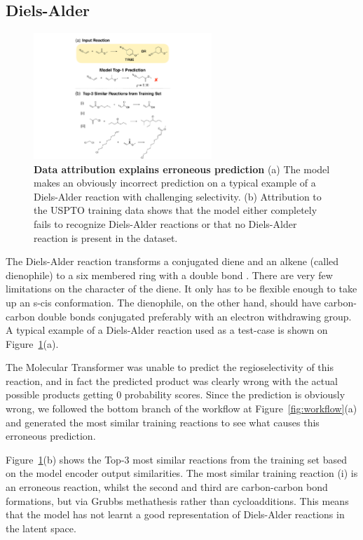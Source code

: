 \subsection{Diels-Alder}

\begin{figure}[ht!]
    \centering
    \includegraphics[width=0.6\textwidth]{Chapters/Transformer/Figs/diels_alder.pdf}
    \caption{\label{fig:diels_alder} \textbf{Data attribution explains erroneous prediction} (a) The model makes an obviously incorrect prediction on a typical example of a Diels-Alder reaction with challenging selectivity. (b) Attribution to the USPTO training data shows that the model either completely fails to recognize Diels-Alder reactions or that no Diels-Alder reaction is present in the dataset.}
\end{figure}

The Diels-Alder reaction transforms a conjugated diene and an alkene (called dienophile) to a six membered ring with a double bond \cite{Clayden2012}. There are very few limitations on the character of the diene. It only has to be flexible enough to take up an s-cis conformation. The dienophile, on the other hand, should have carbon-carbon double bonds conjugated preferably with an electron withdrawing group. A typical example of a Diels-Alder reaction used as a test-case is shown on Figure~\ref{fig:diels_alder}(a). 

The Molecular Transformer was unable to predict the regioselectivity of this reaction, and in fact the predicted product was clearly wrong with the actual possible products getting 0 probability scores. Since the prediction is obviously wrong, we followed the bottom branch of the workflow at Figure~\ref{fig:workflow}(a) and generated the most similar training reactions to see what causes this erroneous prediction.

Figure~\ref{fig:diels_alder}(b) shows the Top-3 most similar reactions from the training set based on the model encoder output similarities. The most similar training reaction (i) is an erroneous reaction, whilst the second and third are carbon-carbon bond formations, but via Grubbs methathesis \cite{grubbs} rather than cycloadditions. This means that the model has not learnt a good representation of Diels-Alder reactions in the latent space. 


